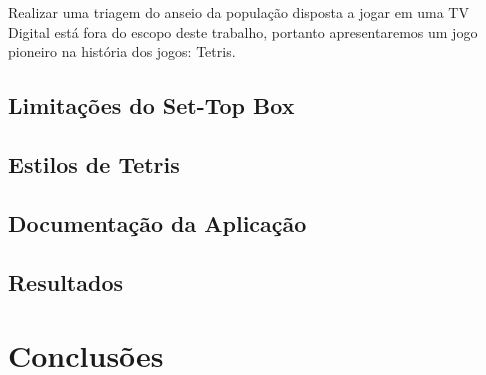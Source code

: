 \documentclass[
	12pt,				%
	openright,			%
	oneside,			%
	a4paper,			%
	brazil,				%
	]{abntex2}
\begin{document}
Realizar uma triagem do anseio da população disposta a jogar em uma TV Digital está fora do escopo deste trabalho, portanto apresentaremos um jogo pioneiro na história dos jogos: Tetris.

\section{Limitações do Set-Top Box}

\section{Estilos de Tetris}

\section{Documentação da Aplicação}

\section{Resultados}

\chapter{Conclusões}
\end{document}
